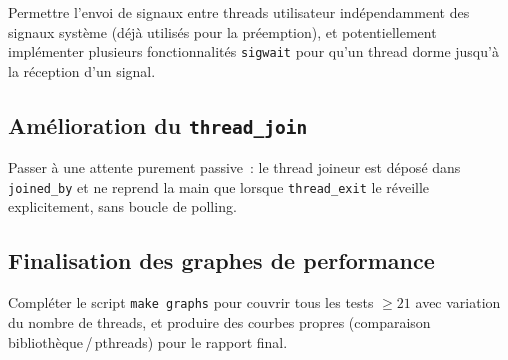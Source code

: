 \documentclass[11pt,a4paper]{article}
\begin{document}
Permettre l'envoi de signaux entre threads utilisateur ind\'ependamment des signaux
syst\`eme (d\'ej\`a utilis\'es pour la pr\'eemption), et potentiellement impl\'ementer plusieurs fonctionnalités
\texttt{sigwait} pour qu'un thread dorme jusqu'\`a la r\'eception d'un signal.

\subsection{Am\'elioration du \texttt{thread\_join}}

Passer \`a une attente purement passive~: le thread joineur est d\'epos\'e dans
\texttt{joined\_by} et ne reprend la main que lorsque \texttt{thread\_exit} le
r\'eveille explicitement, sans boucle de polling.

\subsection{Finalisation des graphes de performance}

Compléter le script \texttt{make graphs} pour couvrir tous les tests $\geq 21$
avec variation du nombre de threads, et produire des courbes propres
(comparaison biblioth\`eque\,/\,pthreads) pour le rapport final.
\end{document}
